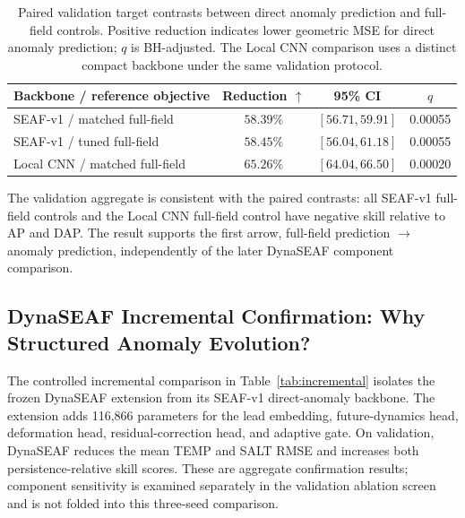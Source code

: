 \documentclass[conference]{IEEEtran}
\begin{document}
\begin{table}[!t]
\centering
\caption{Paired validation target contrasts between direct anomaly prediction and full-field controls. Positive reduction indicates lower geometric MSE for direct anomaly prediction; $q$ is BH-adjusted. The Local CNN comparison uses a distinct compact backbone under the same validation protocol.}
\label{tab:target_contrast}
\footnotesize
\setlength{\tabcolsep}{4pt}
\renewcommand{\arraystretch}{1.12}
\begin{tabular}{lccc}
\toprule
Backbone / reference objective & Reduction $\uparrow$ & 95\% CI & $q$\\
\midrule
SEAF-v1 / matched full-field & $\mathbf{58.39\%}$ & $[56.71,59.91]$ & 0.00055\\
SEAF-v1 / tuned full-field & $\mathbf{58.45\%}$ & $[56.04,61.18]$ & 0.00055\\
Local CNN / matched full-field & $\mathbf{65.26\%}$ & $[64.04,66.50]$ & 0.00020\\
\bottomrule
\end{tabular}
\end{table}

The validation aggregate is consistent with the paired contrasts: all SEAF-v1 full-field controls and the Local CNN full-field control have negative skill relative to AP and DAP. The result supports the first arrow, full-field prediction $\rightarrow$ anomaly prediction, independently of the later DynaSEAF component comparison.

\subsection{DynaSEAF Incremental Confirmation: Why Structured Anomaly Evolution?}
The controlled incremental comparison in Table~\ref{tab:incremental} isolates the frozen DynaSEAF extension from its SEAF-v1 direct-anomaly backbone. The extension adds 116,866 parameters for the lead embedding, future-dynamics head, deformation head, residual-correction head, and adaptive gate. On validation, DynaSEAF reduces the mean TEMP and SALT RMSE and increases both persistence-relative skill scores. These are aggregate confirmation results; component sensitivity is examined separately in the validation ablation screen and is not folded into this three-seed comparison.
\end{document}
